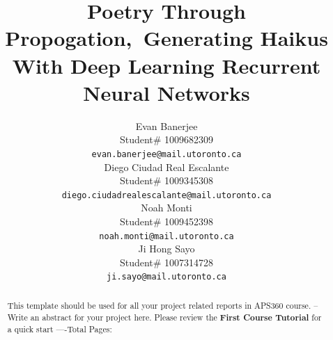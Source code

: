 \documentclass{article} %
\title{Poetry Through Propogation,\ Generating Haikus With Deep Learning Recurrent Neural Networks}
\author{Evan Banerjee  \\
Student\# 1009682309\\
\texttt{evan.banerjee@mail.utoronto.ca} \\
\And
Diego Ciudad Real Escalante  \\
Student\# 1009345308 \\
\texttt{diego.ciudadrealescalante@mail.utoronto.ca} \\
\AND
Noah Monti  \\
Student\# 1009452398 \\
\texttt{noah.monti@mail.utoronto.ca} \\
\And
Ji Hong Sayo \\
Student\# 1007314728 \\
\texttt{ji.sayo@mail.utoronto.ca} \\
}
\begin{document}
\maketitle

\begin{abstract}
This template should be used for all your project related reports in APS360 course. -- Write an abstract for your project here. Please review the \textbf{ First Course Tutorial} for a quick start
----Total Pages: \pageref{last_page}
\end{abstract}










\end{document}
